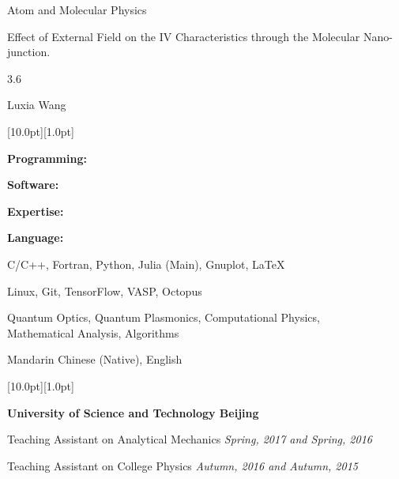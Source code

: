 \documentclass[12pt,a4paper,utf8]{report}
\begin{document}
    \begin{minipage}[t]{11cm}
        Atom and Molecular Physics\par
        Effect of External Field on the IV Characteristics through the Molecular Nano-junction.\par
        3.6\par
        Luxia Wang\par
    \end{minipage}\par
\vspace{0.4cm}

\begin{minipage}[t]{16cm}
    \colorbox{subtitlecolor}{\raisebox{0pt}[10.0pt][1.0pt]{
        \textcolor{white}{\textsf{}}}}
\end{minipage}\par
\vspace{0.2cm}
    \begin{minipage}[t]{4cm}
        \qquad \textbf{Programming:}\par
        \qquad \textbf{Software:}\par
        \qquad \textbf{Expertise:}\par
        \qquad \par
        \qquad \textbf{Language:}\par
    \end{minipage}
    \begin{minipage}[t]{14cm}
        C/C++, Fortran, Python, Julia (Main), Gnuplot, \LaTeX \par
        Linux, Git, TensorFlow, VASP, Octopus \par
        Quantum Optics, Quantum Plasmonics, Computational Physics, \\Mathematical Analysis, Algorithms \par
        Mandarin Chinese (Native), English \par
    \end{minipage}\par
\vspace{0.4cm}

\begin{minipage}[t]{16cm}
    \colorbox{subtitlecolor}{\raisebox{0pt}[10.0pt][1.0pt]{
        \textcolor{white}{\textsf{}}}}
\end{minipage}\par
\vspace{0.2cm}\hspace{0.5cm}
\begin{minipage}[t]{15cm}
    {{\textbf{University of Science and Technology Beijing}}}\par
    \quad Teaching Assistant on Analytical Mechanics \hfill
    {\em{Spring, 2017 and Spring, 2016}}\par
    \quad Teaching Assistant on College Physics\hfill
    {\em{Autumn, 2016 and Autumn, 2015}}\par
\end{minipage}\par
\vspace{0.4cm}
\end{document}

